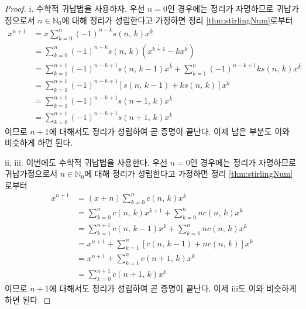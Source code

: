 \begin{proof}
    i. 수학적 귀납법을 사용하자. 우선 $n=0$인 경우에는 정리가 자명하므로 귀납가정으로서 $n\in\mathbb{N}_0$에 대해 정리가 성립한다고 가정하면 정리 \ref{thm:stirlingNum}로부터
    \begin{align*}
        x^{n+1}&=x\sum_{k=0}^n(-1)^{n-k}s(n,\,k)x^{\overline{k}}\\
        &=\sum_{k=0}^n(-1)^{n-k}s(n,\,k)(x^{\overline{k+1}}-kx^{\overline{k}})\\
        &=\sum_{k=1}^{n+1}(-1)^{n-k+1}s(n,\,k-1)x^{\overline{k}}+\sum_{k=1}^n(-1)^{n-k+1}ks(n,\,k)x^{\overline{k}}\\
        &=\sum_{k=1}^{n+1}(-1)^{n-k+1}[s(n,\,k-1)+ks(n,\,k)]x^{\overline{k}}\\
        &=\sum_{k=1}^{n+1}(-1)^{n-k+1}s(n+1,\,k)x^{\overline{k}}\\
        &=\sum_{k=0}^{n+1}(-1)^{n-k+1}s(n+1,\,k)x^{\overline{k}}
    \end{align*}
    이므로 $n+1$에 대해서도 정리가 성립하여 곧 증명이 끝난다. 이제 남은 부분도 이와 비슷하게 하면 된다.

    ii, iii. 이번에도 수학적 귀납법을 사용한다. 우선 $n=0$인 경우에는 정리가 자명하므로 귀납가정으로서 $n\in\mathbb{N}_0$에 대해 정리가 성립한다고 가정하면 정리 \ref{thm:stirlingNum}로부터
    \begin{align*}
        x^{\underline{n+1}}&=(x+n)\sum_{k=0}^nc(n,\,k)x^k\\
        &=\sum_{k=0}^nc(n,\,k)x^{k+1}+\sum_{k=0}^nnc(n,\,k)x^k\\
        &=\sum_{k=1}^{n+1}c(n,\,k-1)x^k+\sum_{k=1}^nnc(n,\,k)x^k\\
        &=x^{n+1}+\sum_{k=1}^n[c(n,\,k-1)+nc(n,\,k)]x^k\\
        &=x^{n+1}+\sum_{k=1}^nc(n+1,\,k)x^k\\
        &=\sum_{k=0}^{n+1}c(n+1,\,k)x^k
    \end{align*}
    이므로 $n+1$에 대해서도 정리가 성립하여 곧 증명이 끝난다. 이제 iii도 이와 비슷하게 하면 된다.
\end{proof}

